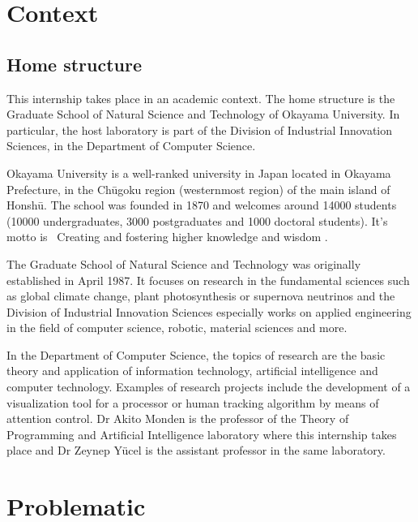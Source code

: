\documentclass[12pt,a4paper,twoside]{article}
\begin{document}
\tableofcontents

\newpage

\section{Context}

\subsection{Home structure}
This internship takes place in an academic context. The home structure is the Graduate School of Natural Science and Technology of Okayama University. In particular, the host laboratory is part of the Division of Industrial Innovation Sciences, in the Department of Computer Science.

Okayama University is a well-ranked university in Japan located in Okayama Prefecture, in the Chūgoku region (westernmost region) of the main island of Honshū. The school was founded in 1870 and welcomes around 14000 students (10000 undergraduates, 3000 postgraduates and 1000 doctoral students). It's motto is \guillemotleft~Creating and fostering higher knowledge and wisdom \guillemotright.

The Graduate School of Natural Science and Technology was originally established in April 1987. It focuses on research in the fundamental sciences such as global climate change, plant photosynthesis or supernova neutrinos and the Division of Industrial Innovation Sciences especially works on applied engineering in the field of computer science, robotic, material sciences and more. 

In the Department of Computer Science, the topics of research are the basic theory and application of information technology, artificial intelligence and computer technology. Examples of research projects include the development of a visualization tool for a processor or human tracking algorithm by means of attention control. Dr Akito Monden is the professor of the Theory of Programming and Artificial Intelligence laboratory where this internship takes place and Dr Zeynep Yücel is the assistant professor in the same laboratory. 

\section{Problematic}
\end{document}
